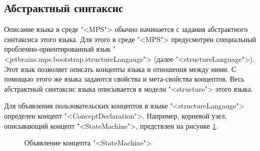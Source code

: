 \subsection{Абстрактный синтаксис}
Описание языка в среде "<MPS"> обычно начинается с задания абстрактного синтаксиса \cite{redDragon} этого языка. Для этого в среде "<MPS"> предусмотрен специальный проблемно-ориентированный язык "<jetbrains.mps.bootstrap.structureLangauge"> (далее "<structureLanguage">). Этот язык позволяет описать концепты языка и отношения между ними. С помощью этого же языка задаются свойства и мета-свойства концептов. Весь абстрактный синтаксис языка описывается в модели "<structure"> этого языка.

Для объявления пользовательских концептов в языке "<structureLangauge"> определен концепт "<ConceptDeclaration">. Например, корневой узел, описывающий концепт "<StateMachine">, предствлен на рисунке \ref{fig:StateMachineConcept}.

\begin{figure}
\centering
{}
\caption{Объявление концепта "<StateMachine">}
\label{fig:StateMachineConcept}
\end{figure}


